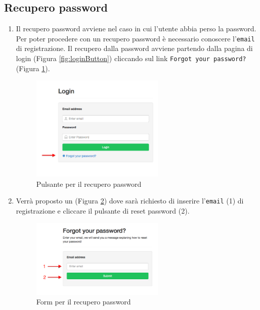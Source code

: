 	\subsection{Recupero password}
		\label{recuperopassword}
		\begin{enumerate}

			\item Il recupero password avviene nel caso in cui l'utente abbia perso la password. Per poter procedere con un recupero password è necessario conoscere l'\texttt{email} di registrazione. Il recupero dalla password avviene partendo dalla pagina di login (Figura \ref{fig:loginButton}) cliccando sul link \texttt{Forgot your password?} (Figura \ref{fig:forgotpwd}).

			\begin{figure}[H]
				\centering \includegraphics[width=0.6\textwidth]{img/forgotpwd.png}
			\caption{ \label{fig:forgotpwd} Pulsante per il recupero password}
			\end{figure}

			\item Verrà proposto un  (Figura \ref{fig:forgotPwdForm}) dove sarà richiesto di inserire l'\texttt{email} (1) di registrazione e cliccare il pulsante di reset password (2).

			\begin{figure}[H]
				\centering \includegraphics[width=0.6\textwidth]{img/forgotPwdForm.png}
			\caption{ \label{fig:forgotPwdForm} Form per il recupero password}
			\end{figure}


\end{enumerate}

